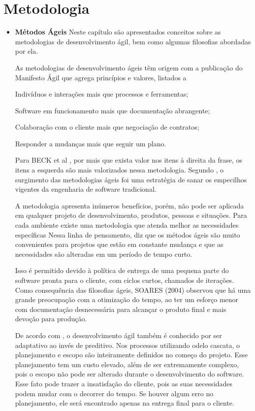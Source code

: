 \chapter[Metodologia]{Metodologia}

\label{sec:Métodos Ágeis}
\begin{itemize}
\item \textbf{Métodos Ágeis}
Neste capítulo são apresentados conceitos sobre as metodologias de
desenvolvimento ágil, bem como algumas filosofias abordadas por ela.

As metodologias de desenvolvimento ágeis têm origem com a publicação
do Manifesto Ágil \cite{manifestoAgil} que agrega princípios e valores, listados a


    Indivíduos e interações mais que processos e ferramentas;

     Software em funcionamento mais que documentação abrangente;

    Colaboração com o cliente mais que negociação de contratos;

     Responder a mudanças mais que seguir um plano.


Para BECK et al \cite{manifestoAgil}, por mais que exista valor nos itens à direita da
frase, os itens a esquerda são mais valorizados nessa metodologia.
Segundo \cite{pressman}, o surgimento das metodologias ágeis foi uma
estratégia de sanar os empecilhos vigentes da engenharia de software tradicional.


A metodologia apresenta inúmeros benefícios, porém, não pode ser aplicada em
qualquer projeto de desenvolvimento, produtos, pessoas e situações. Para cada
ambiente existe uma metodologia que atenda melhor as necessidades específicas
Nessa linha de pensamento, \cite{pressman} diz que os métodos ágeis
são muito convenientes para projetos que estão em constante mudança e que as
necessidades são alteradas em um período de tempo curto.

Isso é permitido
devido à política de entrega de uma pequena parte do software pronta para o
cliente, com ciclos curtos, chamados de iterações.
Como consequência das filosofias ágeis, SOARES (2004) observou que
há uma grande preocupação com a otimização do tempo, ao ter um esforço
menor com documentação desnecessária para alcançar o produto final e mais
devoção para produção.

De acordo com \cite{soares}, o desenvolvimento ágil também é
conhecido por ser adaptativo ao invés de preditivo. Nos processos utilizando
odelo cascata, o planejamento e escopo são inteiramente definidos no começo
do projeto. Esse planejamento tem um custo elevado, além de ser extremamente
complexo, pois o escopo não pode ser alterado durante o desenvolvimento do
software. Esse fato pode trazer a insatisfação do cliente, pois as suas
necessidades podem mudar com o decorrer do tempo. Se houver algum erro no
planejamento, ele será encontrado apenas na entrega final para o cliente.


\end{itemize}
